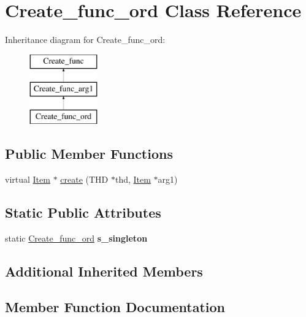 \hypertarget{classCreate__func__ord}{}\section{Create\+\_\+func\+\_\+ord Class Reference}
\label{classCreate__func__ord}
Inheritance diagram for Create\+\_\+func\+\_\+ord\+:\begin{figure}[H]
\begin{center}
\leavevmode
\includegraphics[height=3.000000cm]{classCreate__func__ord}
\end{center}
\end{figure}
\subsection*{Public Member Functions}
\begin{DoxyCompactItemize}
\item 
virtual \mbox{\hyperlink{classItem}{Item}} $\ast$ \mbox{\hyperlink{classCreate__func__ord_afb84db3ba4c0a646cc9144ee947a534e}{create}} (T\+HD $\ast$thd, \mbox{\hyperlink{classItem}{Item}} $\ast$arg1)
\end{DoxyCompactItemize}
\subsection*{Static Public Attributes}
\begin{DoxyCompactItemize}
\item 
\mbox{\label{classCreate__func__ord_ac510f2460e1b38c855d977aff1fac917}} 
static \mbox{\hyperlink{classCreate__func__ord}{Create\+\_\+func\+\_\+ord}} {\bfseries s\+\_\+singleton}
\end{DoxyCompactItemize}
\subsection*{Additional Inherited Members}


\subsection{Member Function Documentation}
\mbox{\label{classCreate__func__ord_afb84db3ba4c0a646cc9144ee947a534e}} 
